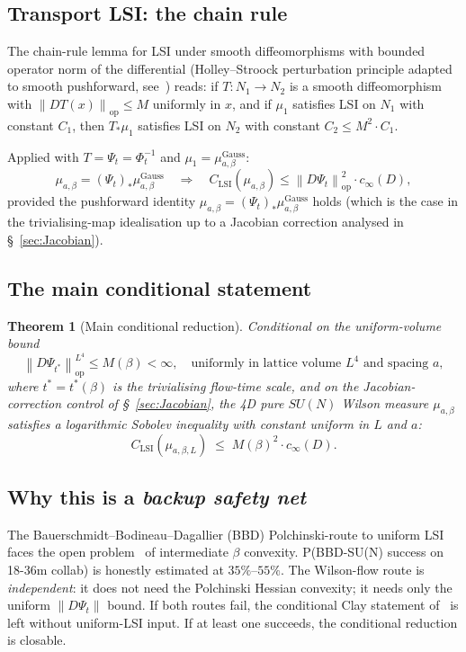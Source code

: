 \documentclass[11pt,a4paper]{amsart}
\newtheorem{theorem}{Theorem}[section]
\theoremstyle{definition}
\newcommand{\norm}[1]{\left\lVert#1\right\rVert}
\begin{document}
\subsection{Transport LSI: the chain rule}
The chain-rule lemma for LSI under smooth diffeomorphisms with bounded
operator norm of the differential
(Holley--Stroock perturbation principle adapted to smooth pushforward,
see~\cite[Sec.~5.4]{BakryGentilLedoux2014}) reads:
if $T : N_1 \to N_2$ is a smooth diffeomorphism with
$\norm{DT(x)}_\mathrm{op} \leq M$ uniformly in $x$, and if $\mu_1$
satisfies LSI on $N_1$ with constant $C_1$, then $T_*\mu_1$ satisfies
LSI on $N_2$ with constant $C_2 \leq M^2 \cdot C_1$.

Applied with $T = \Psi_t = \Phi_t^{-1}$ and $\mu_1 =
\mu^\mathrm{Gauss}_{a,\beta}$:
\begin{equation}\label{eq:LSI-transport}
\mu_{a,\beta} = (\Psi_t)_* \mu^\mathrm{Gauss}_{a,\beta}
\quad\Longrightarrow\quad
C_\mathrm{LSI}(\mu_{a,\beta}) \leq \norm{D\Psi_t}_\mathrm{op}^2 \cdot c_\infty(D),
\end{equation}
provided the pushforward identity $\mu_{a,\beta} = (\Psi_t)_*\mu^\mathrm{Gauss}_{a,\beta}$
holds (which is the case in the trivialising-map idealisation
\cite{Luscher2009TrivializingMaps} up to a Jacobian correction analysed
in \S~\ref{sec:Jacobian}).

\subsection{The main conditional statement}
\begin{theorem}[Main conditional reduction]\label{thm:main-informal}
Conditional on the uniform-volume bound
\begin{equation}\label{eq:uniform-bound}
\norm{D\Psi_{t^*}}_\mathrm{op}^{L^4} \leq M(\beta) < \infty,
\quad \text{uniformly in lattice volume } L^4 \text{ and spacing } a,
\end{equation}
where $t^* = t^*(\beta)$ is the trivialising flow-time scale, and on
the Jacobian-correction control of \S~\ref{sec:Jacobian}, the
4D pure $SU(N)$ Wilson measure $\mu_{a,\beta}$ satisfies a logarithmic
Sobolev inequality with constant uniform in $L$ and $a$:
$$
C_\mathrm{LSI}(\mu_{a,\beta,L}) \;\leq\; M(\beta)^2 \cdot c_\infty(D).
$$
\end{theorem}

\subsection{Why this is a \emph{backup safety net}}
The Bauerschmidt--Bodineau--Dagallier (BBD) Polchinski-route to uniform
LSI faces the open
problem~\cite[Hyp.~(H1a-iii)]{OpusPolchinskiSubgaps2026} of intermediate
$\beta$ convexity. P(BBD-SU(N) success on 18-36m collab) is honestly
estimated at $35\%$--$55\%$. The Wilson-flow route is
\emph{independent}: it does not need the Polchinski Hessian convexity;
it needs only the uniform $\norm{D\Psi_t}$ bound. If both routes fail,
the conditional Clay statement of~\cite{RemondiereKRFPB_2026} is left
without uniform-LSI input. If at least one succeeds, the conditional
reduction is closable.
\end{document}
